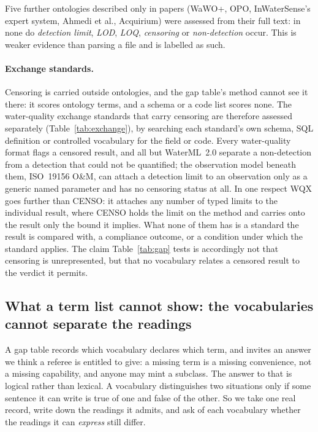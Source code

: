 Five further ontologies described only in papers (WaWO+, OPO, InWaterSense's
expert system, Ahmedi et al., Acquirium) were assessed from their full
text: in none do \emph{detection
limit}, \emph{LOD}, \emph{LOQ}, \emph{censoring} or \emph{non-detection} occur.
This is weaker evidence than parsing a file and is labelled as such.

\paragraph{Exchange standards.}

Censoring is carried outside ontologies, and the gap table's method cannot see
it there: it scores ontology terms, and a schema or a code list scores none. The
water-quality exchange standards that carry censoring are therefore assessed
separately (Table~\ref{tab:exchange}), by searching each standard's own schema,
SQL definition or controlled vocabulary for the field or
code. Every water-quality format flags
a censored result, and all but WaterML~2.0 separate a non-detection from a
detection that could not be quantified; the observation model beneath them,
ISO~19156 O\&M, can attach a detection limit to an observation only as a generic
named parameter and has no censoring status at all. In one respect WQX goes further than CENSO: it attaches
any number of typed limits to the individual result, where CENSO holds the limit
on the method and carries onto the result only the bound it implies. What none
of them has is a standard the result is compared with, a compliance outcome, or
a condition under which the standard applies. The claim Table~\ref{tab:gap}
tests is accordingly not that censoring is unrepresented, but that no vocabulary
relates a censored result to the verdict it permits.

\subsection{What a term list cannot show: the vocabularies cannot separate the
readings}
\label{sec:results-separation}
A gap table records which vocabulary declares which term, and invites an
answer we think a referee is entitled to give: a missing term is a missing
convenience, not a missing capability, and anyone may mint a subclass. The
answer to that is logical rather than lexical. A vocabulary distinguishes two
situations only if some sentence it can write is true of one and false of the
other. So we take one real record, write down the readings it admits, and ask
of each vocabulary whether the readings it can \emph{express} still
differ.

